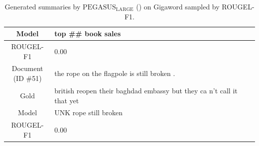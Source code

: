 \begin{table}[bth!]
\begin{tabular}{c|p{}}
\\ \hline
Model & 
top \#\# book sales
\\ \hline
ROUGEL-F1 & 
0.00
\\ \hline
\makecell{Document\\(ID \#51)} & 
the rope on the flagpole is still broken .
\\ \hline
Gold & 
british reopen their baghdad embassy but they ca n't call it that yet
\\ \hline
Model & 
UNK rope still broken
\\ \hline
ROUGEL-F1 & 
0.00
\\ \hline
\end{tabular}
\caption{Generated summaries by $\text{PEGASUS}_{\text{LARGE}}$ (\gnews) on Gigaword sampled by ROUGEL-F1.}
\end{table}
